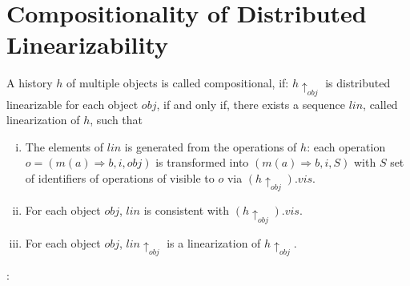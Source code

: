
\section{Compositionality of Distributed Linearizability}
\label{sec:compositionality of distributed linearizability}


\begin{definition}[Compositionality]
\label{definition:compositionality} 
A history $h$ of multiple objects is called compositional, if: $h \uparrow_{\mathit{obj}}$ is distributed linearizable for each object $\mathit{obj}$, if and only if, there exists a sequence $\mathit{lin}$, called linearization of $h$, such that

\begin{enumerate}[(i)]
\item The elements of $\mathit{lin}$ is generated from the operations of $h$: each operation $o = (m(a) \Rightarrow b,i,\mathit{obj})$ is transformed into $(m(a) \Rightarrow b,i,S)$ with $S$ set of identifiers of operations of visible to $o$ via $( h \uparrow_{\mathit{obj}}). \mathit{vis}$. 
\item For each object $\mathit{obj}$, $\mathit{lin}$ is consistent with $( h \uparrow_{\mathit{obj}}). \mathit{vis}$.  
\item For each object $\mathit{obj}$, $\mathit{lin} \uparrow_{ \mathit{obj} }$ is a linearization of $h \uparrow_{\mathit{obj}}$. 
\end{enumerate}
\end{definition} 

: 








